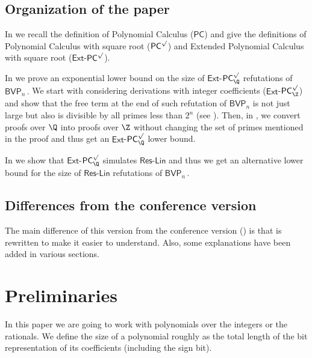 \documentclass{toc}
\begin{document}
%
%
%
%
%
%
%
%
%
%
%
%

\subsection{Organization of the paper}
In  we recall the definition of Polynomial Calculus ($\mathsf{PC}$) and give the definitions of Polynomial Calculus with square root ($\mathsf{PC}^{\surd}$) and Extended Polynomial Calculus with square root ($\mathsf{Ext}$-$\mathsf{PC}^{\surd}$).

In  we prove an exponential lower bound on the size of $\mathsf{Ext}$-$\mathsf{PC}_{\Q}^{\surd}$ refutations of %
$\mathsf{BVP}_n\,.$ %
 We start with considering derivations with integer coefficients ($\mathsf{Ext}$-$\mathsf{PC}_{\Z}^{\surd}$) and show that the free term at %
the end of such refutation of $\mathsf{BVP}_n$ is not just large but also is divisible by all primes less than $2^n$ (see ). Then, in , we convert proofs over $\Q$ into proofs over $\Z$ without changing the set of primes mentioned in the proof and thus get an $\mathsf{Ext}$-$\mathsf{PC}_{\Q}^{\surd}$ lower bound.

In  we show that $\mathsf{Ext}$-$\mathsf{PC}_{\Q}^{\surd}$ simulates $\mathsf{Res}$-$\mathsf{Lin}$ and thus we get an alternative lower bound for the size of $\mathsf{Res}$-$\mathsf{Lin}$ refutations of %
$\mathsf{BVP}_n\,.$ %

\subsection{Differences from the conference version} 
The main difference of this version from the conference version 
(\cite{conf-version}) %
is that  is %
rewritten  %
to make it easier %
to understand.  %
Also, some explanations %
have been  %
added in various sections.


\section{Preliminaries}\label{sec:prelim}
In this paper we are going to work with polynomials over 
%
the integers or the rationals.  %
We define the size of a polynomial roughly as the total length of the bit representation
of its coefficients (including the sign bit).
%
%
\end{document}
